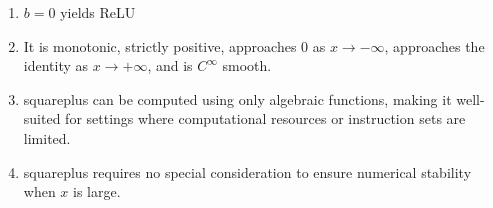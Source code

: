 \begin{enumerate}
    \item $b=0$ yields ReLU
    \item It is monotonic, strictly positive, approaches 0 as \({\displaystyle x\to -\infty }\), approaches the identity as \({\displaystyle x\to +\infty }\), and is \({\displaystyle C^{\infty }}\) smooth.
    \item squareplus can be computed using only algebraic functions, making it well-suited for settings where computational resources or instruction sets are limited.
    \item squareplus requires no special consideration to ensure numerical stability when \({\displaystyle x}\) is large.
\end{enumerate}






















































